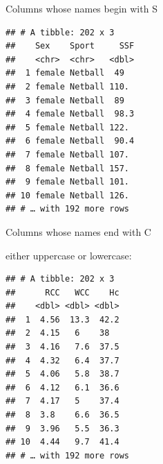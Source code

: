 \documentclass[
  ignorenonframetext,
]{beamer}
\newenvironment{Shaded}{\begin{snugshade}}{\end{snugshade}}
\newcommand{\KeywordTok}[1]{\textcolor[rgb]{0.13,0.29,0.53}{\textbf{#1}}}
\newcommand{\NormalTok}[1]{#1}
\newcommand{\OperatorTok}[1]{\textcolor[rgb]{0.81,0.36,0.00}{\textbf{#1}}}
\newcommand{\StringTok}[1]{\textcolor[rgb]{0.31,0.60,0.02}{#1}}
\begin{document}
\begin{frame}[fragile]{Columns whose names begin with S}
\protect\hypertarget{columns-whose-names-begin-with-s}{}

\begin{Shaded}
\end{Shaded}

\begin{verbatim}
## # A tibble: 202 x 3
##    Sex    Sport     SSF
##    <chr>  <chr>   <dbl>
##  1 female Netball  49  
##  2 female Netball 110. 
##  3 female Netball  89  
##  4 female Netball  98.3
##  5 female Netball 122. 
##  6 female Netball  90.4
##  7 female Netball 107. 
##  8 female Netball 157. 
##  9 female Netball 101. 
## 10 female Netball 126. 
## # … with 192 more rows
\end{verbatim}

\end{frame}

\begin{frame}[fragile]{Columns whose names end with C}
\protect\hypertarget{columns-whose-names-end-with-c}{}

either uppercase or lowercase:

\begin{Shaded}
\end{Shaded}

\begin{verbatim}
## # A tibble: 202 x 3
##      RCC   WCC    Hc
##    <dbl> <dbl> <dbl>
##  1  4.56  13.3  42.2
##  2  4.15   6    38  
##  3  4.16   7.6  37.5
##  4  4.32   6.4  37.7
##  5  4.06   5.8  38.7
##  6  4.12   6.1  36.6
##  7  4.17   5    37.4
##  8  3.8    6.6  36.5
##  9  3.96   5.5  36.3
## 10  4.44   9.7  41.4
## # … with 192 more rows
\end{verbatim}

\end{frame}
\end{document}
